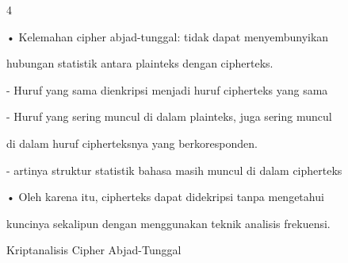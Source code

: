 \documentclass{article}
\begin{document}

4

• Kelemahan cipher abjad-tunggal: tidak dapat menyembunyikan 

hubungan statistik antara plainteks dengan cipherteks.

   -  Huruf yang sama dienkripsi menjadi huruf cipherteks yang sama

   -  Huruf yang sering muncul di dalam plainteks, juga sering muncul 

di dalam huruf cipherteksnya yang berkoresponden.

    - artinya struktur statistik bahasa masih muncul di dalam cipherteks

• Oleh karena itu, cipherteks dapat didekripsi tanpa mengetahui 

kuncinya sekalipun dengan menggunakan teknik analisis frekuensi.

Kriptanalisis Cipher Abjad-Tunggal
\end{document}
